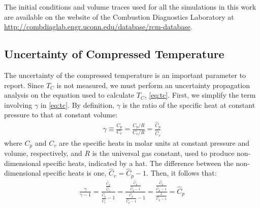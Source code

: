 \documentclass[../main.tex]{subfiles}
\begin{document}
The initial conditions and volume traces used for all the simulations
in this work are available on the website of the Combustion Diagnostics
Laboratory at \\
\href{http://combdiaglab.engr.uconn.edu/database/rcm-database}{http://combdiaglab.engr.uconn.edu/database/rcm-database}.

\subsection{Uncertainty of Compressed Temperature}
\label{sec:uncertainty}

The uncertainty of the compressed temperature is an important parameter
to report. Since $T_C$ is not measured, we must perform an uncertainty
propagation analysis on the equation used to calculate $T_C$,
\cref{eq:tc}. First, we simplify the term involving $\gamma$ in
\cref{eq:tc}. By definition, $\gamma$ is the ratio of the specific heat
at constant pressure to that at constant volume:
%
\begin{align}
\gamma \equiv \frac{C_p}{C_v} = \frac{C_p/R}{C_v/R} = \frac{\hat{C}_p}{\hat{C}_v}
\end{align}
%
where $C_p$ and $C_v$ are the specific heats in molar units at constant
pressure and volume, respectively, and $R$ is the universal gas constant,
used to produce non-dimensional specific heats, indicated by a hat. The
difference between the non-dimensional specific heats is one,
$\hat{C}_v = \hat{C}_p - 1$. Then, it follows that:
%
\begin{align}
\label{eq:simplify-gamma}
\frac{\gamma}{\gamma - 1} = \frac{\frac{\hat{C}_p}{\hat{C}_v}}{\frac{\hat{C}_p}{\hat{C}_v} - 1}
= \frac{\frac{\hat{C}_p}{\hat{C}_p - 1}}{\frac{\hat{C}_p}{\hat{C}_p - 1} - 1}
= \frac{\frac{\hat{C}_p}{\hat{C}_p - 1}}{\frac{1}{\hat{C}_p - 1}}
= \hat{C}_p
\end{align}
\end{document}
